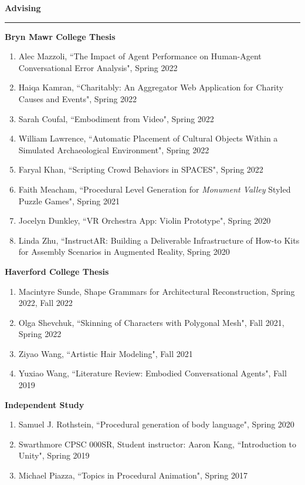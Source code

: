 \pagebreak

\needspace{6em}
{\large {\bf Advising}}
\vspace{0.1cm}
\hrule
\medskip
\medskip

{\bf Bryn Mawr College Thesis }
\vspace{-1.0em}

\begin{enumerate}[leftmargin=*,label={}]
\item Alec Mazzoli, ``The Impact of Agent Performance on Human-Agent Conversational Error Analysis", Spring 2022
\item Haiqa Kamran, ``Charitably: An Aggregator Web Application for Charity Causes and Events", Spring 2022
\item Sarah Coufal, ``Embodiment from Video", Spring 2022
\item William Lawrence, ``Automatic Placement of Cultural Objects Within a Simulated Archaeological Environment", Spring 2022
\item Faryal Khan, ``Scripting Crowd Behaviors in SPACES", Spring 2022 
\item Faith Meacham, ``Procedural Level Generation for \textit{Monument Valley} Styled Puzzle Games", Spring 2021
\item Jocelyn Dunkley, ``VR Orchestra App: Violin Prototype", Spring 2020
\item Linda Zhu, ``InstructAR: Building a Deliverable Infrastructure of How-to Kits for Assembly Scenarios in Augmented Reality, Spring 2020
\end{enumerate}

{\bf Haverford College Thesis}
\vspace{-1.0em}

\begin{enumerate}[leftmargin=*,label={}]
\item Macintyre Sunde, Shape Grammars for Architectural Reconstruction, Spring 2022, Fall 2022
\item Olga Shevchuk, ``Skinning of Characters with Polygonal Mesh", Fall 2021, Spring 2022
\item Ziyao Wang, ``Artistic Hair Modeling", Fall 2021
\item Yuxiao Wang, ``Literature Review: Embodied Conversational Agents", Fall 2019
\end{enumerate}

{\bf Independent Study}
\vspace{-1.0em}

\begin{enumerate}[leftmargin=*,label={}]
\item Samuel J. Rothstein, ``Procedural generation of body language", Spring 2020
\item Swarthmore CPSC 000SR, Student instructor: Aaron Kang, ``Introduction to Unity", Spring 2019
\item Michael Piazza, ``Topics in Procedural Animation", Spring 2017
\end{enumerate}

